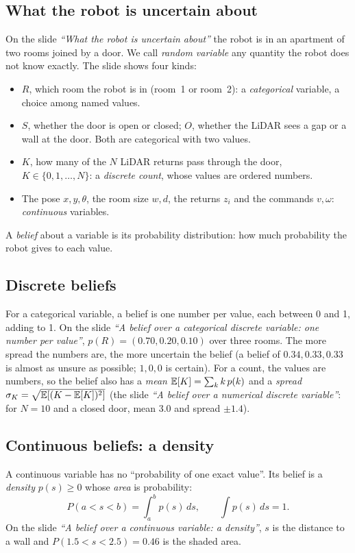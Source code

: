 \documentclass[11pt]{article}
\newcommand{\slide}[1]{\textit{``#1''}}
\begin{document}
\subsection*{What the robot is uncertain about}
On the slide \slide{What the robot is uncertain about} the robot is in an apartment of two rooms joined by a door. We call \emph{random variable} any quantity the robot does not know exactly.
The slide shows four kinds:
\begin{itemize}[nosep]
\item $R$, which room the robot is in (room~1 or room~2): a \emph{categorical} variable, a choice among named values.
\item $S$, whether the door is open or closed; $O$, whether the LiDAR sees a gap or a wall at the door. Both are categorical with two values.
\item $K$, how many of the $N$ LiDAR returns pass through the door, $K\in\{0,1,\dots,N\}$: a \emph{discrete count}, whose values are ordered numbers.
\item The pose $x,y,\theta$, the room size $w,d$, the returns $z_i$ and the commands $v,\omega$: \emph{continuous} variables.
\end{itemize}
A \emph{belief} about a variable is its probability distribution: how much probability the robot gives to each value.

\subsection*{Discrete beliefs}
For a categorical variable, a belief is one number per value, each between 0 and 1, adding to 1.
On the slide \slide{A belief over a categorical discrete variable: one number per value}, $p(R)=(0.70, 0.20, 0.10)$ over three rooms. The more spread the numbers are, the more uncertain the belief
(a belief of $0.34, 0.33, 0.33$ is almost as unsure as possible; $1, 0, 0$ is certain).
For a count, the values are numbers, so the belief also has a \emph{mean} $\mathbb{E}[K]=\sum_k k\,p(k)$ and a \emph{spread} $\sigma_K=\sqrt{\mathbb{E}[(K-\mathbb{E}[K])^2]}$ (the slide \slide{A belief over a numerical discrete variable}:
for $N=10$ and a closed door, mean 3.0 and spread $\pm1.4$).

\subsection*{Continuous beliefs: a density}
A continuous variable has no ``probability of one exact value''. Its belief is a \emph{density} $p(s)\ge0$ whose \emph{area} is probability:
\[
P(a<s<b)=\int_a^b p(s)\,ds,\qquad \int p(s)\,ds=1 .
\]
On the slide \slide{A belief over a continuous variable: a density}, $s$ is the distance to a wall and $P(1.5<s<2.5)=0.46$ is the shaded area.
\end{document}
